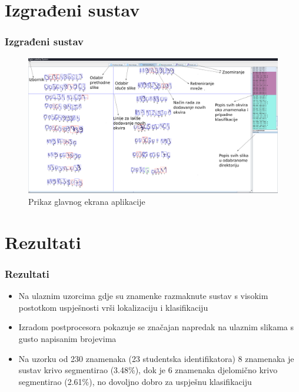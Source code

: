 \documentclass{beamer}
\begin{document}

\section{Izgrađeni sustav}

\begin{frame}
	\frametitle{Izgrađeni sustav}
	\begin{figure}[h]
		\centering
		\includegraphics[scale=0.18]{master_detail.png}
		\caption{Prikaz glavnog ekrana aplikacije}
	\end{figure}
\end{frame}

\section{Rezultati}
\begin{frame}
	\frametitle{Rezultati}
	\begin{itemize}
		\item Na ulaznim uzorcima gdje su znamenke razmaknute sustav s visokim postotkom uspješnosti vrši lokalizaciju i klasifikaciju
		\item Izradom postprocesora pokazuje se značajan napredak na ulaznim slikama s gusto napisanim brojevima
		\item Na uzorku od 230 znamenaka (23 studentska identifikatora) 8 znamenaka je sustav krivo segmentirao (3.48\%), dok je 6 znamenaka djelomično krivo segmentirao (2.61\%), no dovoljno dobro za uspješnu klasifikaciju
	\end{itemize}
\end{frame}
\end{document}
